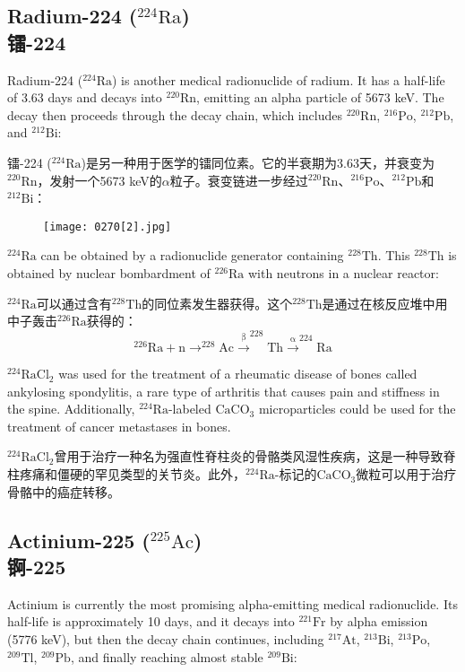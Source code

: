 \documentclass[dvipsnames, svgnames,a4paper,11pt]{article}
\begin{document}
\subsection{Radium-224 (\(\mathrm{^{224}Ra}\)) \\镭-224}  
Radium-224 (\(\mathrm{^{224}Ra}\)) is another medical radionuclide of radium. It has a half-life of 3.63 days and decays into \(\mathrm{^{220}Rn}\), emitting an alpha particle of 5673 keV. The decay then proceeds through the decay chain, which includes \(\mathrm{^{220}Rn}\), \(\mathrm{^{216}Po}\), \(\mathrm{^{212}Pb}\), and \(\mathrm{^{212}Bi}\):

镭-224 (\(\mathrm{^{224}Ra}\))是另一种用于医学的镭同位素。它的半衰期为3.63天，并衰变为\(\mathrm{^{220}Rn}\)，发射一个5673 keV的$\alpha$粒子。衰变链进一步经过\(\mathrm{^{220}Rn}\)、\(\mathrm{^{216}Po}\)、\(\mathrm{^{212}Pb}\)和\(\mathrm{^{212}Bi}\)：  

\begin{figure}[h]
	\centering
    \texttt{[image: 0270[2].jpg]}  
     \label{fig365}
\end{figure}


\(\mathrm{^{224}Ra}\) can be obtained by a radionuclide generator containing \(\mathrm{^{228}Th}\). This \(\mathrm{^{228}Th}\) is obtained by nuclear bombardment of \(\mathrm{^{226}Ra}\) with neutrons in a nuclear reactor:

\(\mathrm{^{224}Ra}\)可以通过含有\(\mathrm{^{228}Th}\)的同位素发生器获得。这个\(\mathrm{^{228}Th}\)是通过在核反应堆中用中子轰击\(\mathrm{^{226}Ra}\)获得的：
\[
\mathrm{^{226}Ra + n \to ^{228}Ac \xrightarrow{\beta} ^{228}Th \xrightarrow{\alpha} ^{224}Ra}
\]

\(\mathrm{^{224}RaCl_2}\) was used for the treatment of a rheumatic disease of bones called ankylosing spondylitis, a rare type of arthritis that causes pain and stiffness in the spine. Additionally, \(\mathrm{^{224}Ra}\)-labeled \(\mathrm{CaCO_3}\) microparticles could be used for the treatment of cancer metastases in bones.

\(\mathrm{^{224}RaCl_2}\)曾用于治疗一种名为强直性脊柱炎的骨骼类风湿性疾病，这是一种导致脊柱疼痛和僵硬的罕见类型的关节炎。此外，\(\mathrm{^{224}Ra}\)-标记的\(\mathrm{CaCO_3}\)微粒可以用于治疗骨骼中的癌症转移。

\subsection{Actinium-225 (\(\mathrm{^{225}Ac}\)) \\锕-225}  
Actinium is currently the most promising alpha-emitting medical radionuclide. Its half-life is approximately 10 days, and it decays into \(\mathrm{^{221}Fr}\) by alpha emission (5776 keV), but then the decay chain continues, including \(\mathrm{^{217}At}\), \(\mathrm{^{213}Bi}\), \(\mathrm{^{213}Po}\), \(\mathrm{^{209}Tl}\), \(\mathrm{^{209}Pb}\), and finally reaching almost stable \(\mathrm{^{209}Bi}\):  
\end{document}
